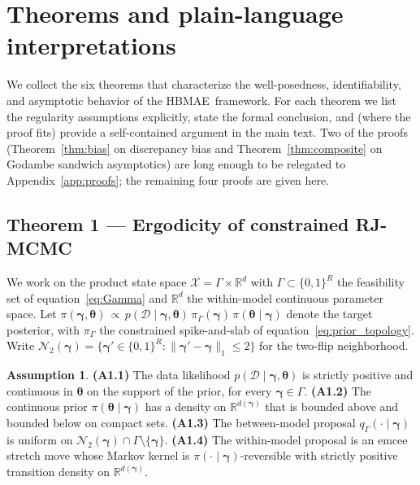 \documentclass[12pt]{article}
\theoremstyle{plain}
\theoremstyle{definition}
\newtheorem{assumption}{Assumption}
\theoremstyle{remark}
\newcommand{\HBMAE}{HBMAE\xspace}
\newcommand{\R}{\mathbb{R}}
\newcommand{\norm}[1]{\lVert #1 \rVert}
\begin{document}
\section{Theorems and plain-language interpretations}\label{sec:theorems}

We collect the six theorems that characterize the well-posedness,
identifiability, and asymptotic behavior of the \HBMAE\ framework.  For
each theorem we list the regularity assumptions explicitly, state the
formal conclusion, and (where the proof fits) provide a self-contained
argument in the main text.  Two of the proofs (Theorem~\ref{thm:bias} on
discrepancy bias and Theorem~\ref{thm:composite} on Godambe sandwich
asymptotics) are long enough to be relegated to
Appendix~\ref{app:proofs}; the remaining four proofs are given here.

\subsection{Theorem 1 --- Ergodicity of constrained RJ-MCMC}\label{sec:thm1}

We work on the product state space
$\mathcal{X}=\Gamma\times\R^{d}$ with $\Gamma\subset\{0,1\}^R$ the
feasibility set of equation~\eqref{eq:Gamma} and $\R^d$ the within-model
continuous parameter space.  Let $\pi(\boldsymbol\gamma,\boldsymbol\theta)
\,\propto\, p(\mathcal{D}\mid\boldsymbol\gamma,\boldsymbol\theta)\,
\pi_\Gamma(\boldsymbol\gamma)\,\pi(\boldsymbol\theta\mid\boldsymbol\gamma)$
denote the target posterior, with $\pi_\Gamma$ the constrained
spike-and-slab of equation~\eqref{eq:prior_topology}.  Write
$\mathcal{N}_2(\boldsymbol\gamma)=\{\boldsymbol\gamma'\in\{0,1\}^R:
\norm{\boldsymbol\gamma'-\boldsymbol\gamma}_1\le 2\}$ for the two-flip
neighborhood.

\begin{assumption}\label{ass:thm1}
\textbf{(A1.1)} The data likelihood
$p(\mathcal{D}\mid\boldsymbol\gamma,\boldsymbol\theta)$ is strictly
positive and continuous in $\boldsymbol\theta$ on the support of the
prior, for every $\boldsymbol\gamma\in\Gamma$.
\textbf{(A1.2)} The continuous prior $\pi(\boldsymbol\theta\mid
\boldsymbol\gamma)$ has a density on $\R^{d(\boldsymbol\gamma)}$ that is
bounded above and bounded below on compact sets.
\textbf{(A1.3)} The between-model proposal $q_\Gamma(\cdot\mid
\boldsymbol\gamma)$ is uniform on $\mathcal{N}_2(\boldsymbol\gamma)\cap
\Gamma\setminus\{\boldsymbol\gamma\}$.
\textbf{(A1.4)} The within-model proposal is an emcee stretch move
\citep{ForemanMackey2013} whose Markov kernel is $\pi(\cdot\mid
\boldsymbol\gamma)$-reversible with strictly positive transition density
on $\R^{d(\boldsymbol\gamma)}$.
\end{assumption}
\end{document}
